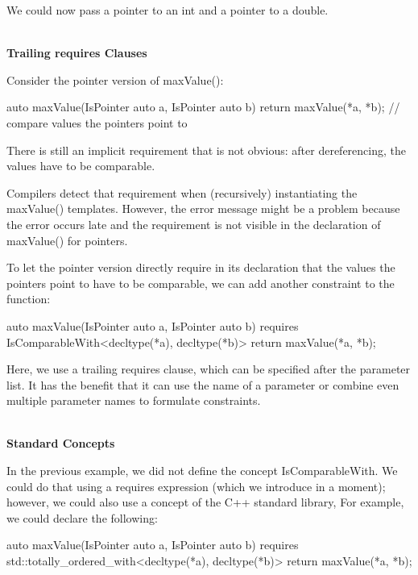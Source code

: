 We could now pass a pointer to an int and a pointer to a double.

\noindent
\hspace*{\fill} \\ %
\textbf{Trailing requires Clauses}

Consider the pointer version of maxValue():

\begin{cpp}
auto maxValue(IsPointer auto a, IsPointer auto b)
{
	return maxValue(*a, *b); // compare values the pointers point to
}
\end{cpp}

There is still an implicit requirement that is not obvious: after dereferencing, the values have to be comparable.

Compilers detect that requirement when (recursively) instantiating the maxValue() templates. However, the error message might be a problem because the error occurs late and the requirement is not visible in the declaration of maxValue() for pointers.

To let the pointer version directly require in its declaration that the values the pointers point to have to be comparable, we can add another constraint to the function:

\begin{cpp}
auto maxValue(IsPointer auto a, IsPointer auto b)
requires IsComparableWith<decltype(*a), decltype(*b)>
{
	return maxValue(*a, *b);
}
\end{cpp}

Here, we use a trailing requires clause, which can be specified after the parameter list. It has the benefit that it can use the name of a parameter or combine even multiple parameter names to formulate constraints.

\noindent
\hspace*{\fill} \\ %
\textbf{Standard Concepts}

In the previous example, we did not define the concept IsComparableWith. We could do that using a requires expression (which we introduce in a moment); however, we could also use a concept of the C++ standard library, For example, we could declare the following:

\begin{cpp}
auto maxValue(IsPointer auto a, IsPointer auto b)
requires std::totally_ordered_with<decltype(*a), decltype(*b)>
{
	return maxValue(*a, *b);
}
\end{cpp}

